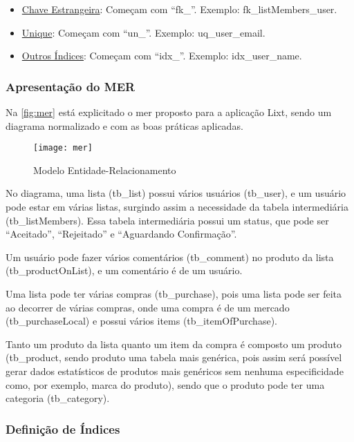 \begin{itemize}
	\item \underline{Chave Estrangeira}: Começam com ``fk\_''. Exemplo: fk\_listMembers\_user. 
	\item \underline{Unique}: Começam com ``un\_''. Exemplo: uq\_user\_email.
	\item \underline{Outros Índices}: Começam com ``idx\_''. Exemplo: idx\_user\_name. 
\end{itemize}


\subsubsection{Apresentação do MER}

Na \autoref{fig:mer} está explicitado o \gls{mer} proposto para a aplicação Lixt, sendo um diagrama normalizado e com as boas práticas aplicadas.

\begin{figure}[H]
  \centering
  \caption{Modelo Entidade-Relacionamento}
  \label{fig:mer}
  \texttt{[image: mer]}
\end{figure}

No diagrama, uma lista (tb\_list) possui vários usuários (tb\_user), e um usuário pode estar em várias listas, surgindo assim a necessidade da tabela intermediária (tb\_listMembers). Essa tabela intermediária possui um status, que pode ser ``Aceitado'', ``Rejeitado'' e ``Aguardando Confirmação''.

Um usuário pode fazer vários comentários (tb\_comment) no produto da lista (tb\_productOnList), e um comentário é de um usuário.

Uma lista pode ter várias compras (tb\_purchase), pois uma lista pode ser feita ao decorrer de várias compras, onde uma compra é de um mercado (tb\_purchaseLocal) e possui vários items (tb\_itemOfPurchase).

Tanto um produto da lista quanto um item da compra é 
composto um produto (tb\_product, sendo produto uma tabela mais genérica, pois assim será possível gerar dados estatísticos de produtos mais genéricos sem nenhuma especificidade como, por exemplo, marca do produto), sendo que o produto pode ter uma categoria (tb\_category).

\subsubsection{Definição de Índices}

